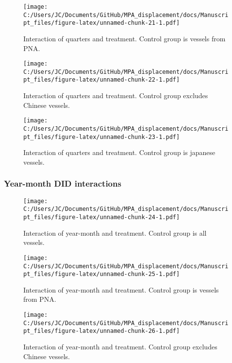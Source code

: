 \documentclass[11pt,]{article}
\begin{document}
\begin{figure}
\centering
\texttt{[image: C:/Users/JC/Documents/GitHub/MPA\_displacement/docs/Manuscript\_files/figure-latex/unnamed-chunk-21-1.pdf]}
\caption{\label{fig:unnamed-chunk-21}\label{fig:q2}Interaction of quarters
and treatment. Control group is vessels from PNA.}
\end{figure}

\begin{figure}
\centering
\texttt{[image: C:/Users/JC/Documents/GitHub/MPA\_displacement/docs/Manuscript\_files/figure-latex/unnamed-chunk-22-1.pdf]}
\caption{\label{fig:unnamed-chunk-22}\label{fig:q3}Interaction of quarters
and treatment. Control group excludes Chinese vessels.}
\end{figure}

\begin{figure}
\centering
\texttt{[image: C:/Users/JC/Documents/GitHub/MPA\_displacement/docs/Manuscript\_files/figure-latex/unnamed-chunk-23-1.pdf]}
\caption{\label{fig:unnamed-chunk-23}\label{fig:q4}Interaction of quarters
and treatment. Control group is japanese vessels.}
\end{figure}

\hypertarget{year-month-did-interactions}{%
\subsubsection{Year-month DID
interactions}\label{year-month-did-interactions}}

\begin{figure}
\centering
\texttt{[image: C:/Users/JC/Documents/GitHub/MPA\_displacement/docs/Manuscript\_files/figure-latex/unnamed-chunk-24-1.pdf]}
\caption{\label{fig:unnamed-chunk-24}\label{fig:ym1}Interaction of
year-month and treatment. Control group is all vessels.}
\end{figure}

\begin{figure}
\centering
\texttt{[image: C:/Users/JC/Documents/GitHub/MPA\_displacement/docs/Manuscript\_files/figure-latex/unnamed-chunk-25-1.pdf]}
\caption{\label{fig:unnamed-chunk-25}\label{fig:ym2}Interaction of
year-month and treatment. Control group is vessels from PNA.}
\end{figure}

\begin{figure}
\centering
\texttt{[image: C:/Users/JC/Documents/GitHub/MPA\_displacement/docs/Manuscript\_files/figure-latex/unnamed-chunk-26-1.pdf]}
\caption{\label{fig:unnamed-chunk-26}\label{fig:ym3}Interaction of
year-month and treatment. Control group excludes Chinese vessels.}
\end{figure}
\end{document}
